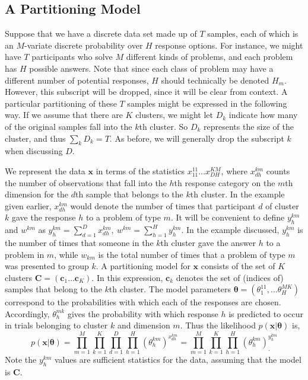 \documentclass{elsart}
\begin{document}
\subsection{A Partitioning Model}


Suppose that we have a discrete data set made up of $T$ samples, each of which is an $M$-variate
discrete probability over $H$ response options. For instance, we might have $T$ participants who
solve $M$ different kinds of problems, and each problem has $H$ possible answers. Note that since
each class of problem may have a different number of potential responses, $H$ should technically
be denoted $H_m$. However, this subscript will be dropped, since it will be clear from context. A
particular partitioning of these $T$ samples might be expressed in the following way. If we assume
that there are $K$ clusters, we might let $D_k$ indicate how many of the original samples fall
into the $k$th cluster. So $D_k$ represents the size of the cluster, and thus $\sum_k D_k = T$. As
before, we will generally drop the subscript $k$ when discussing $D$.


We represent the data $\bm{x}$ in terms of the statistics $x_{11}^{11} \ldots x^{KM}_{DH}$, where
$x^{km}_{dh}$ counts the number of observations that fall into the $h$th response category on the
$m$th dimension for the $d$th sample that belongs to the $k$th cluster. In the example given
earlier, $x^{km}_{dh}$ would denote the number of times that participant $d$ of cluster $k$ gave
the response $h$ to a problem of type $m$. It will be convenient to define $y^{km}_h$ and $w^{km}$
as $y^{km}_h = \sum_{d=1}^D x^{km}_{dh},\ w^{km} = \sum_{h=1}^H y^{km}_h$.
In the example discussed, $y^{km}_h$ is the number of times that someone in the
$k$th cluster gave the answer $h$ to a problem in $m$, while $w_{km}$ is the total number of times
that a problem of type $m$ was presented to group $k$. A partitioning model for $\bm{x}$ consists
of the set of $K$ clusters $\bm{C}=(\bm{c}_1 \ldots \bm{c}_K)$. In this expression, $\bm{c}_k$
denotes the set of (indices of) samples that belong to the $k$th cluster. The model parameters
$\bm{\theta} = (\theta^{11}_1, \ldots \theta^{MK}_H)$ correspond to the probabilities with which
each of the responses are chosen. Accordingly, ${\theta}^{mk}_h$ gives the probability with which
response $h$ is predicted to occur in trials belonging to cluster $k$ and dimension $m$. Thus the
likelihood $p(\bm{x}|\bm{\theta})$ is,
\begin{displaymath}
p(\bm{x} | \bm{\theta})
= \prod_{m=1}^M \prod_{k=1}^K \prod_{d=1}^D \prod_{h=1}^H (\theta^{km}_{h})^{x^{km}_{dh}}
= \prod_{m=1}^M \prod_{k=1}^K \prod_{h=1}^H (\theta^{km}_h)_{.}^{y^{km}_h}
\end{displaymath}
\noindent Note the $y^{km}_h$ values are sufficient statistics for the data, assuming that the
model is $\bm{C}$.
\end{document}
